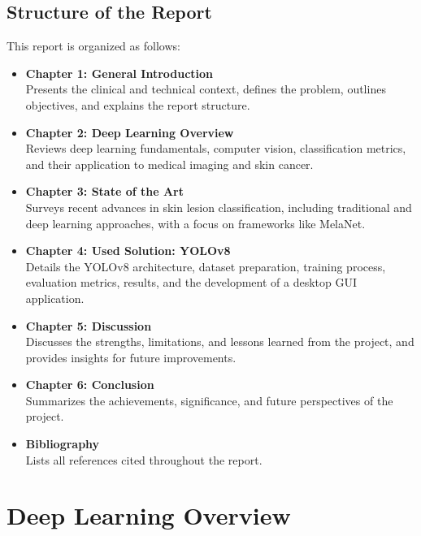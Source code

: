 \documentclass[a4paper,12pt]{report}
\begin{document}
\begin{spacing}{1.5}
    \section{Structure of the Report}
    This report is organized as follows:

    \begin{itemize}
        \item \textbf{Chapter 1: General Introduction} \\
        Presents the clinical and technical context, defines the problem, outlines objectives, and explains the report structure.

        \item \textbf{Chapter 2: Deep Learning Overview} \\
        Reviews deep learning fundamentals, computer vision, classification metrics, and their application to medical imaging and skin cancer.

        \item \textbf{Chapter 3: State of the Art} \\
        Surveys recent advances in skin lesion classification, including traditional and deep learning approaches, with a focus on frameworks like MelaNet.

        \item \textbf{Chapter 4: Used Solution: YOLOv8} \\
        Details the YOLOv8 architecture, dataset preparation, training process, evaluation metrics, results, and the development of a desktop GUI application.

        \item \textbf{Chapter 5: Discussion} \\
        Discusses the strengths, limitations, and lessons learned from the project, and provides insights for future improvements.

        \item \textbf{Chapter 6: Conclusion} \\
        Summarizes the achievements, significance, and future perspectives of the project.

        \item \textbf{Bibliography} \\
        Lists all references cited throughout the report.
    \end{itemize}


\chapter{Deep Learning Overview}


\end{spacing}
\end{document}
